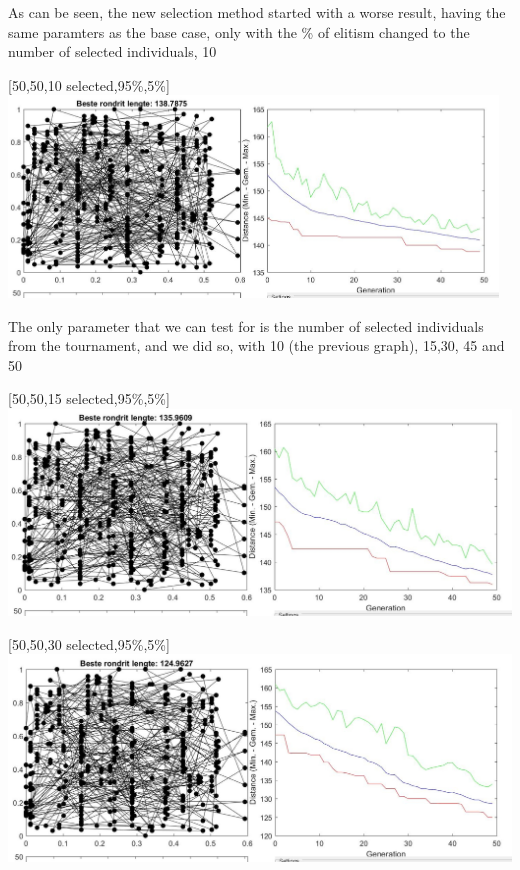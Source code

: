 As can be seen, the new selection method started with a worse result, having
the same paramters as the base case, only with the \% of elitism
changed to the number of selected individuals, 10

\begin{center}
[50,50,10 selected,95\%,5\%]\\
\includegraphics[width=13cm]{img/optional/optional_1.jpg}
\end{center}

The only parameter that we can test for is the number of selected
individuals from the tournament, and we did so, with 10 (the previous graph),
15,30, 45 and 50\\

\begin{center}
[50,50,15 selected,95\%,5\%]\\
\includegraphics[width=15cm]{img/optional/optional_2.jpg}
\end{center}


\begin{center}
[50,50,30 selected,95\%,5\%\big]\\
\includegraphics[width=15cm]{img/optional/optional_3.jpg}
\end{center}

